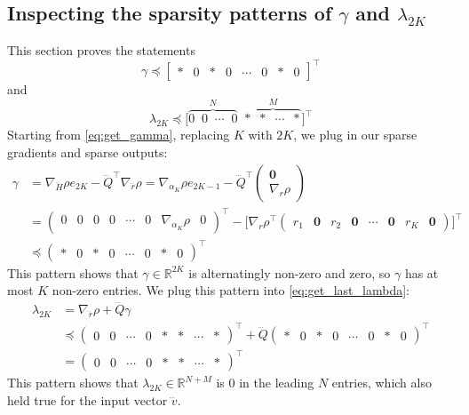 \documentclass[a4paper,12pt]{article}
\theoremstyle{definition}
\begin{document}
\subsection{Inspecting the sparsity patterns of $\gamma$ and $\lambda_{2K}$}\label{subsec:sparsity_gamma_lambda2K}
This section proves the statements $$\gamma \preceq \begin{bmatrix} * & 0 & * & 0 & \cdots & 0 & * & 0 \end{bmatrix}^\top$$ and $$\lambda_{2K} \preceq \big[\overbrace{0 \;\; 0 \;\; \cdots \;\; 0}^{N} \;\; \overbrace{* \;\; * \;\; \cdots \;\; *}^{M}\big] ^\top$$
Starting from \eqref{eq:get_gamma}, replacing $K$ with $2K$, we plug in our sparse gradients and sparse outputs:
\begin{align}
    \gamma &= \nabla_{\dddot{H}} \rho e_{2K} - \dddot{Q}^\top \nabla_{\dddot{r}} \rho = \nabla_{\alpha_{K}} \rho e_{2K-1} - \dddot{Q}^\top \begin{pmatrix}\mathbf{0} \\ \nabla_r\rho\end{pmatrix} \nonumber
    \\
    &= \begin{pmatrix}0 \!&\! 0 \!&\! 0 \!&\! 0 \!&\! \cdots \!&\! 0 \!&\! \nabla_{\alpha_K} \rho \!&\! 0\end{pmatrix}^\top
    - 
    \bigg[\nabla_{r} \rho ^\top \begin{pmatrix}r_1 \!&\! \mathbf{0} \!&\! r_2 \!&\! \mathbf{0} \!&\! \cdots \!&\!\mathbf{0}\!&\! r_K \!&\! \mathbf{0}\end{pmatrix}\bigg]^\top \nonumber
    \\
    &\preceq 
    \begin{pmatrix}* \!&\! 0 \!&\! * \!&\! 0 \!&\! \cdots \!&\! 0 \!&\! * \!&\! 0\end{pmatrix}^\top \label{eq:gamma_sparsity_pattern}
\end{align}
This pattern shows that $\gamma \in \mathbb{R}^{2K}$ is alternatingly non-zero and zero, so $\gamma$ has at most $K$ non-zero entries. We plug this pattern into \eqref{eq:get_last_lambda}:
\begin{align}
    \lambda_{2K} &= \nabla_{\dddot{r}} \rho + \dddot{Q} \gamma \nonumber
    \\ &\preceq \begin{pmatrix}0 \!&\! 0 \!&\! \cdots \!&\! 0 \!&\! * \!&\! * \!&\! \cdots \!&\! *\end{pmatrix}^\top + \dddot{Q} \begin{pmatrix}* \!&\! 0 \!&\! * \!&\! 0 \!&\! \cdots \!&\! 0\!&\! * \!&\! 0\end{pmatrix}^\top \nonumber
    \\
    &= \begin{pmatrix}0 \!&\! 0 \!&\! \cdots \!&\! 0 \!&\! * \!&\! * \!&\! \cdots \!&\! *\end{pmatrix}^\top \label{eq:lambda_2K_sparsity_pattern}
\end{align}
This pattern shows that $\lambda_{2K} \in \mathbb{R}^{N+M}$ is $0$ in the leading $N$ entries, which also held true for the input vector $\dddot{v}$.
\end{document}
